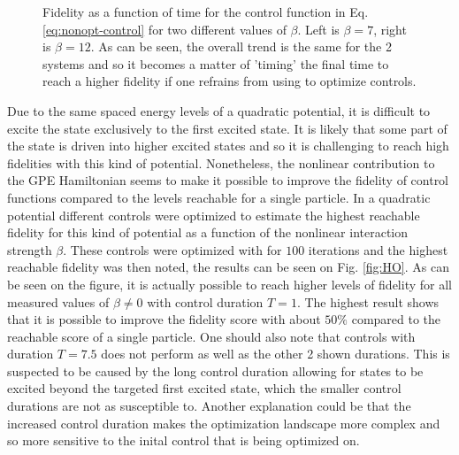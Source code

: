 \documentclass[a4paper, twocolumn]{revtex4-1}
\begin{document}
\begin{figure}
\begin{subfigure}{0.45\columnwidth}
	\end{subfigure}
	\caption{Fidelity as a function of time for the control function in Eq. \eqref{eq:nonopt-control} for two different values of $\beta$. Left is $\beta=7$, right is $\beta=12$. As can be seen, the overall trend is the same for the 2 systems and so it becomes a matter of 'timing' the final time to reach a higher fidelity if one refrains from using  to optimize controls.}
	\label{fig:fidelityplot}
\end{figure}


Due to the same spaced energy levels of a quadratic potential, it is difficult to excite the state exclusively to the first excited state. It is likely that some part of the state is driven into higher excited states and so it is challenging to reach high fidelities with this kind of potential. Nonetheless, the nonlinear contribution to the GPE Hamiltonian seems to make it possible to improve the fidelity of control functions compared to the levels reachable for a single particle. In a quadratic potential different controls were optimized to estimate the highest reachable fidelity for this kind of potential as a function of the nonlinear interaction strength $\beta$. These controls were optimized with  for $100$ iterations and the highest reachable fidelity was then noted, the results can be seen on Fig. \ref{fig:HO}. As can be seen on the figure, it is actually possible to reach higher levels of fidelity for all measured values of $\beta \neq 0$ with control duration $T = 1$. The highest result shows that it is possible to improve the fidelity score with about $50\%$ compared to the reachable score of a single particle. One should also note that controls with duration $T=7.5$ does not perform as well as the other 2 shown durations. This is suspected to be caused by the long control duration allowing for states to be excited beyond the targeted first excited state, which the smaller control durations are not as susceptible to. Another explanation could be that the increased control duration makes the optimization landscape more complex and so more sensitive to the inital control that is being optimized on.
\end{document}
